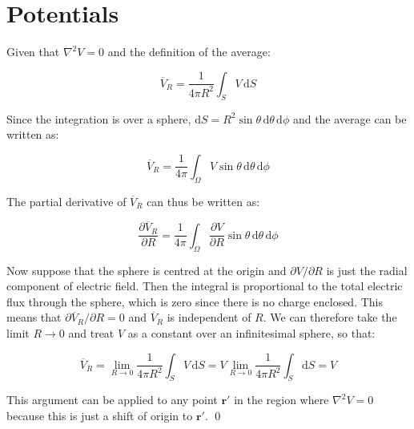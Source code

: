 \documentclass[12pt]{article}
\begin{document}



\pagebreak
\section*{Potentials}



Given that $\nabla^2 V = 0$ and the definition of the average:

\begin{equation}
    \overline{V}_{R} = \frac{1}{4\pi R^2} \int_{S} V \, \mathrm{d}S
\end{equation}

Since the integration is over a sphere, $\mathrm{d}S = R^{2} \sin{\theta} \, \mathrm{d}\theta \, \mathrm{d}\phi$ and the average can be written as:

\begin{equation}
    \overline{V}_{R} = \frac{1}{4\pi} \int_{\Omega} V \sin{\theta} \, \mathrm{d}\theta \, \mathrm{d}\phi
\end{equation}

The partial derivative of $\overline{V}_{R}$ can thus be written as:

\begin{equation}
    \frac{\partial \overline{V}_{R}}{\partial R} = \frac{1}{4\pi} \int_{\Omega} \frac{\partial V}{\partial R} \sin{\theta} \, \mathrm{d}\theta \, \mathrm{d}\phi
\end{equation}

Now suppose that the sphere is centred at the origin and $\partial V/\partial R$ is just the radial component of electric field. Then the integral is proportional to the total electric flux through the sphere, which is zero since there is no charge enclosed. This means that $\partial \overline{V}_{R}/\partial R = 0$ and $\overline{V}_{R}$ is independent of $R$. We can therefore take the limit $R \to 0$ and treat $V$ as a constant over an infinitesimal sphere, so that:

\begin{equation}
    \overline{V}_{R} = \lim_{R \to 0} \frac{1}{4\pi R^2} \int_{S} V \, \mathrm{d}S = V \lim_{R \to 0} \frac{1}{4\pi R^2} \int_{S} \mathrm{d}S = V
\end{equation}

This argument can be applied to any point $\mathbf{r}'$ in the region where $\nabla^2 V = 0$ because this is just a shift of origin to $\mathbf{r}'$.
\qed
\end{document}
